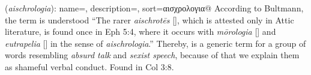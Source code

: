 \item[Shameful talk,]

(\textit{aischrologia}):
{
    name=,
    description={},
    sort=αισχρολογια@
}
According to Bultmann, the term is understood ``The rarer \emph{aischrotēs} [], which is attested only in Attic literature, is found once in Eph 5:4, where it occurs with \emph{mōrologia} [] and \emph{eutrapelia} [] in the sense of \emph{aischrologia}.'' 
Thereby,  is a generic term for a group of words resembling \emph{absurd talk} and \emph{sexist speech}, because of that we explain them as shameful verbal conduct.
Found in Col 3:8.

